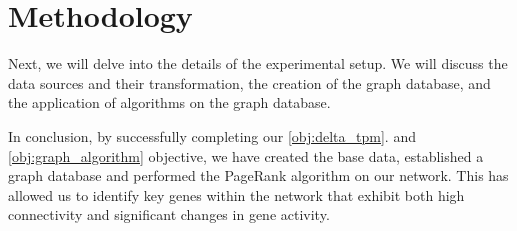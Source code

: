 \section{Methodology} \label{sec:methodology}
Next, we will delve into the details of the experimental setup.
We will discuss the data sources and their transformation, the creation of the graph database,
and the application of algorithms on the graph database.










In conclusion, by successfully completing our \ref{obj:delta_tpm}. and \ref{obj:graph_algorithm} objective,
we have created the base data, established a graph database and performed the PageRank algorithm on our network.
This has allowed us to identify key genes within the network that exhibit both high connectivity
and significant changes in gene activity.
